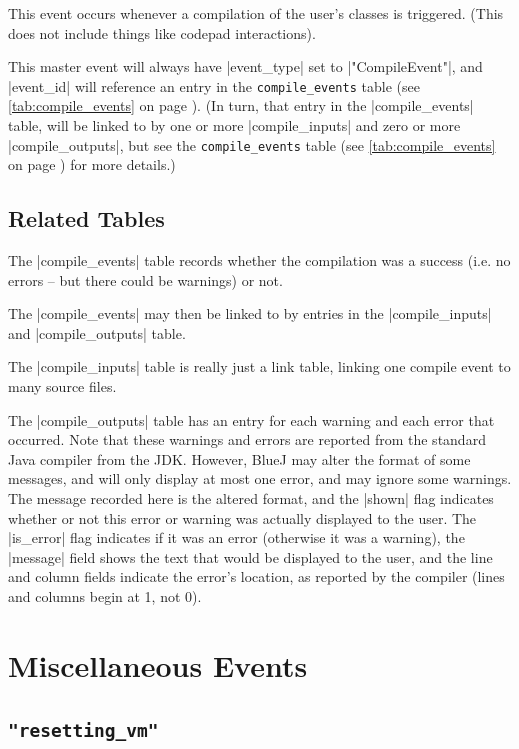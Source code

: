 \documentclass{report}
\newcommand{\myref}[1]{\autoref{#1} on page \pageref*{#1}}
\newcommand{\tabref}[1]{\lstinline|#1| table (see \myref{tab:#1})}
\begin{document}
This event occurs whenever a compilation of the user's classes is triggered.
(This does not include things like codepad interactions).

This master event will always have |event_type| set to |"CompileEvent"|, and
|event_id| will reference an entry in the \tabref{compile_events}.  (In turn,
that entry in the |compile_events| table, will be linked to by one or more
|compile_inputs| and zero or more |compile_outputs|, but see the
\tabref{compile_events} for more details.)

\subsection{Related Tables}

The |compile_events| table records whether the compilation was a success
(i.e. no errors -- but there could be warnings) or not.


The |compile_events| may then be linked to by entries in the |compile_inputs| and
|compile_outputs| table.


The |compile_inputs| table is really just a link table, linking one compile
event to many source files.


The |compile_outputs| table has an entry for each warning and each error that
occurred.  Note that these warnings and errors are reported from the standard Java
compiler from the JDK.  However, BlueJ may alter the format of some messages,
and will only display at most one error, and may ignore some warnings.  The
message recorded here is the altered format, and the |shown| flag indicates
whether or not this error or warning was actually displayed to the user.  The
|is_error| flag indicates if it was an error (otherwise it was a warning), the
|message| field shows the text that would be displayed to the user, and the
line and column fields indicate the error's location, as reported by the
compiler  (lines and columns begin at 1, not 0).

\section{Miscellaneous Events}

\subsection{\lstinline!"resetting_vm"!}
\end{document}
